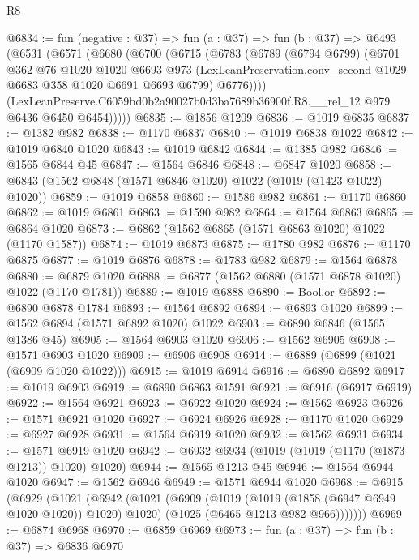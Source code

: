 \begin{lexlean}{R8}
\begin{coremodule}
@6834 := fun (negative : @37) =>
  fun (a : @37) =>
  fun (b : @37) =>
  @6493
    (@6531
      (@6571
        (@6680
          (@6700
            (@6715
              (@6783
                (@6789
                  (@6794 @6799)
                  (@6701
                    @362
                    @76
                    @1020
                    @1020
                    @6693
                    @973
                    (LexLeanPreservation.conv_second @1029 @6683 @358 @1020 @6691 @6693 @6799)
                    @6776))))
            (LexLeanPreserve.C6059bd0b2a90027b0d3ba7689b36900f.R8.__rel_12
              @979
              @6436
              @6450
              @6454)))))
@6835 := @1856 @1209
@6836 := @1019 @6835
@6837 := @1382 @982
@6838 := @1170 @6837
@6840 := @1019 @6838 @1022
@6842 := @1019 @6840 @1020
@6843 := @1019 @6842
@6844 := @1385 @982
@6846 := @1565 @6844 @45
@6847 := @1564 @6846
@6848 := @6847 @1020
@6858 := @6843 (@1562 @6848 (@1571 @6846 @1020) @1022 (@1019 (@1423 @1022) @1020))
@6859 := @1019 @6858
@6860 := @1586 @982
@6861 := @1170 @6860
@6862 := @1019 @6861
@6863 := @1590 @982
@6864 := @1564 @6863
@6865 := @6864 @1020
@6873 := @6862 (@1562 @6865 (@1571 @6863 @1020) @1022 (@1170 @1587))
@6874 := @1019 @6873
@6875 := @1780 @982
@6876 := @1170 @6875
@6877 := @1019 @6876
@6878 := @1783 @982
@6879 := @1564 @6878
@6880 := @6879 @1020
@6888 := @6877 (@1562 @6880 (@1571 @6878 @1020) @1022 (@1170 @1781))
@6889 := @1019 @6888
@6890 := Bool.or
@6892 := @6890 @6878 @1784
@6893 := @1564 @6892
@6894 := @6893 @1020
@6899 := @1562 @6894 (@1571 @6892 @1020) @1022
@6903 := @6890 @6846 (@1565 @1386 @45)
@6905 := @1564 @6903 @1020
@6906 := @1562 @6905
@6908 := @1571 @6903 @1020
@6909 := @6906 @6908
@6914 := @6889 (@6899 (@1021 (@6909 @1020 @1022)))
@6915 := @1019 @6914
@6916 := @6890 @6892
@6917 := @1019 @6903
@6919 := @6890 @6863 @1591
@6921 := @6916 (@6917 @6919)
@6922 := @1564 @6921
@6923 := @6922 @1020
@6924 := @1562 @6923
@6926 := @1571 @6921 @1020
@6927 := @6924 @6926
@6928 := @1170 @1020
@6929 := @6927 @6928
@6931 := @1564 @6919 @1020
@6932 := @1562 @6931
@6934 := @1571 @6919 @1020
@6942 := @6932 @6934 (@1019 (@1019 (@1170 (@1873 @1213)) @1020) @1020)
@6944 := @1565 @1213 @45
@6946 := @1564 @6944 @1020
@6947 := @1562 @6946
@6949 := @1571 @6944 @1020
@6968 := @6915
    (@6929
      (@1021
        (@6942
          (@1021
            (@6909
              (@1019 (@1019 (@1858 (@6947 @6949 @1020 @1020)) @1020) @1020)
              (@1025 (@6465 @1213 @982 @966)))))))
@6969 := @6874 @6968
@6970 := @6859 @6969
@6973 := fun (a : @37) => fun (b : @37) => @6836 @6970

\end{coremodule}
\end{lexlean}
